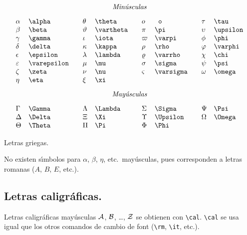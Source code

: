 \begin{table}
$$
\begin{array}{ll@{\hspace{.7cm}}ll@{\hspace{.7cm}}ll@{\hspace{.7cm}}ll}
\multicolumn{8}{c}{\mbox{\it Min{\'u}sculas}} \\[.3cm]
 \alpha & \verb+\alpha+ & \theta & \verb+\theta+&  o & \verb+ o+ &
\tau & \verb+\tau+ \\
 \beta & \verb+\beta+ & \vartheta & \verb+\vartheta+ & \pi &
\verb+\pi+ & \upsilon & \verb+\upsilon+ \\
 \gamma & \verb+\gamma+ & \iota & \verb+\iota+ & \varpi &
\verb+\varpi+ & \phi & \verb+\phi+ \\
 \delta & \verb+\delta+ & \kappa & \verb+\kappa+ & \rho &
\verb+\rho+ & \varphi & \verb+\varphi+ \\
 \epsilon & \verb+\epsilon+ & \lambda & \verb+\lambda+ & \varrho &
\verb+\varrho+ & \chi & \verb+\chi+ \\
 \varepsilon & \verb+\varepsilon+ & \mu & \verb+\mu+ & \sigma &
\verb+\sigma+ & \psi & \verb+\psi+ \\
 \zeta & \verb+\zeta+ & \nu & \verb+\nu+ & \varsigma &
\verb+\varsigma+ & \omega & \verb+\omega+ \\
 \eta & \verb+\eta+ & \xi & \verb+\xi+ && \\[.3cm]
\multicolumn{8}{c}{\mbox{\it May{\'u}sculas}}\\[.3cm]
 \Gamma & \verb+\Gamma+ & \Lambda & \verb+\Lambda+ & \Sigma &
\verb+\Sigma+ & \Psi & \verb+\Psi+ \\
 \Delta & \verb+\Delta+ & \Xi & \verb+\Xi+ & \Upsilon &
\verb+\Upsilon+ & \Omega & \verb+\Omega+ \\
 \Theta & \verb+\Theta+ & \Pi & \verb+\Pi+ & \Phi & \verb+\Phi+ &
\end{array}
$$
\caption{Letras griegas.}
\label{griegas}
\end{table}

No existen s{\'\i}mbolos para $\alpha$, $\beta$, $\eta$, etc.\ may{\'u}sculas, pues
corresponden a letras romanas ($A$, $B$, $E$, etc.).

\subsection{Letras caligr{\'a}ficas.}

Letras caligr{\'a}ficas may{\'u}sculas $\cal A$, $\cal B$, \ldots, $\cal Z$ se
obtienen con \verb+\cal+. \verb+\cal+ se usa igual que los otros
comandos de cambio de font (\verb+\rm+, \verb+\it+, etc.).

